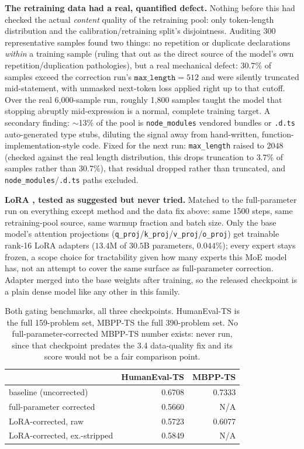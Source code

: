 \documentclass{article}
\theoremstyle{plain}
\theoremstyle{definition}
\theoremstyle{remark}
\begin{document}
\textbf{The retraining data had a real, quantified defect.} Nothing
before this had checked the actual \emph{content} quality of the
retraining pool: only token-length distribution and the
calibration/retraining split's disjointness. Auditing 300 representative
samples found two things: no repetition or duplicate declarations
\emph{within} a training sample (ruling that out as the direct source of
the model's own repetition/duplication pathologies), but a real
mechanical defect: $30.7\%$ of samples exceed the correction run's
$\texttt{max\_length}{=}512$ and were silently truncated mid-statement,
with unmasked next-token loss applied right up to that cutoff. Over the
real 6,000-sample run, roughly 1,800 samples taught the model that
stopping abruptly mid-expression is a normal, complete training target.
A secondary finding: $\sim$13\% of the pool is \texttt{node\_modules}
vendored bundles or \texttt{.d.ts} auto-generated type stubs, diluting
the signal away from hand-written, function-implementation-style code.
Fixed for the next run: \texttt{max\_length} raised to $2048$ (checked
against the real length distribution, this drops truncation to $3.7\%$
of samples rather than $30.7\%$), that residual dropped rather than
truncated, and \texttt{node\_modules}/\texttt{.d.ts} paths excluded.

\textbf{LoRA \cite{lora2022}, tested as \citet{minitron2024practice}
suggested but never tried.} Matched to the full-parameter run on everything except method
and the data fix above: same 1500 steps, same retraining-pool source,
same warmup fraction and batch size. Only the base model's attention
projections (\texttt{q\_proj}/\texttt{k\_proj}/\texttt{v\_proj}/\texttt{o\_proj})
get trainable rank-16 LoRA adapters ($13.4$M of $30.5$B parameters,
$0.044\%$); every expert stays frozen, a scope choice for tractability
given how many experts this MoE model has, not an attempt to cover the
same surface as full-parameter correction. Adapter merged into the base
weights after training, so the released checkpoint is a plain dense
model like any other in this family.

\begin{table}[t]
\centering
\scriptsize
\setlength{\tabcolsep}{3pt}
\begin{tabular}{lrr}
\toprule
& HumanEval-TS & MBPP-TS \\
\midrule
baseline (uncorrected) & 0.6708 & 0.7333 \\
full-parameter corrected & 0.5660 & N/A \\
LoRA-corrected, raw & 0.5723 & 0.6077 \\
LoRA-corrected, ex.-stripped & 0.5849 & N/A \\
\bottomrule
\end{tabular}
\caption{Both gating benchmarks, all three checkpoints. HumanEval-TS is
the full 159-problem set, MBPP-TS the full 390-problem set. No
full-parameter-corrected MBPP-TS number exists: never run, since that
checkpoint predates the 3.4 data-quality fix and its score would not be
a fair comparison point.}
\label{tab:teacher-correction-lora-humaneval}
\end{table}
\end{document}
